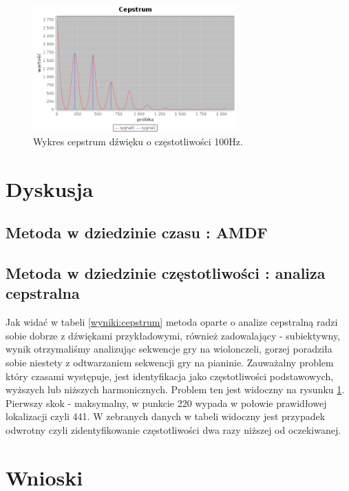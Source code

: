 \documentclass{classrep}
\begin{document}
\begin{figure}[H]
  \centering
  \includegraphics[width=0.7\textwidth]{cepstrum_artificial_100}
  \caption{Wykres cepstrum dźwięku o częstotliwości 100Hz.}
  \label{fig_cepstrum100}
\end{figure}


\section{Dyskusja}

\subsection{Metoda w dziedzinie czasu : AMDF}

\subsection{Metoda w dziedzinie częstotliwości : analiza cepstralna}

Jak widać w tabeli \ref{wyniki:cepstrum} metoda oparte o analize cepstralną radzi sobie dobrze z dźwiękami przykładowymi, również zadowalający - subiektywny, wynik otrzymaliśmy analizując sekwencje gry na wiolonczeli, gorzej poradziła sobie niestety z odtwarzaniem sekwencji gry na pianinie. Zauważalny problem który czasami występuje, jest identyfikacja jako częstotliwości podstawowych, wyższych lub niższych harmonicznych. Problem ten jest widoczny na rysunku \ref{fig_cepstrum100}. Pierwszy skok - maksymalny, w punkcie 220 wypada w połowie prawidłowej lokalizacji czyli 441. W zebranych danych w tabeli widoczny jest przypadek odwrotny czyli zidentyfikowanie częstotliwości dwa razy niższej od oczekiwanej.



\section{Wnioski}
\end{document}
